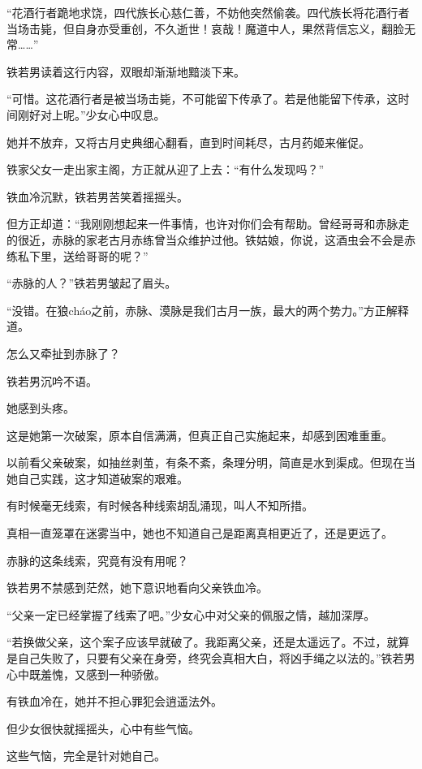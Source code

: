 
\begin{this_body}

“花酒行者跪地求饶，四代族长心慈仁善，不妨他突然偷袭。四代族长将花酒行者当场击毙，但自身亦受重创，不久逝世！哀哉！魔道中人，果然背信忘义，翻脸无常……”

铁若男读着这行内容，双眼却渐渐地黯淡下来。

“可惜。这花酒行者是被当场击毙，不可能留下传承了。若是他能留下传承，这时间刚好对上呢。”少女心中叹息。

她并不放弃，又将古月史典细心翻看，直到时间耗尽，古月药姬来催促。

铁家父女一走出家主阁，方正就从迎了上去：“有什么发现吗？”

铁血冷沉默，铁若男苦笑着摇摇头。

但方正却道：“我刚刚想起来一件事情，也许对你们会有帮助。曾经哥哥和赤脉走的很近，赤脉的家老古月赤练曾当众维护过他。铁姑娘，你说，这酒虫会不会是赤练私下里，送给哥哥的呢？”

“赤脉的人？”铁若男皱起了眉头。

“没错。在狼cháo之前，赤脉、漠脉是我们古月一族，最大的两个势力。”方正解释道。

怎么又牵扯到赤脉了？

铁若男沉吟不语。

她感到头疼。

这是她第一次破案，原本自信满满，但真正自己实施起来，却感到困难重重。

以前看父亲破案，如抽丝剥茧，有条不紊，条理分明，简直是水到渠成。但现在当她自己实践，这才知道破案的艰难。

有时候毫无线索，有时候各种线索胡乱涌现，叫人不知所措。

真相一直笼罩在迷雾当中，她也不知道自己是距离真相更近了，还是更远了。

赤脉的这条线索，究竟有没有用呢？

铁若男不禁感到茫然，她下意识地看向父亲铁血冷。

“父亲一定已经掌握了线索了吧。”少女心中对父亲的佩服之情，越加深厚。

“若换做父亲，这个案子应该早就破了。我距离父亲，还是太遥远了。不过，就算是自己失败了，只要有父亲在身旁，终究会真相大白，将凶手绳之以法的。”铁若男心中既羞愧，又感到一种骄傲。

有铁血冷在，她并不担心罪犯会逍遥法外。

但少女很快就摇摇头，心中有些气恼。

这些气恼，完全是针对她自己。


\end{this_body}
